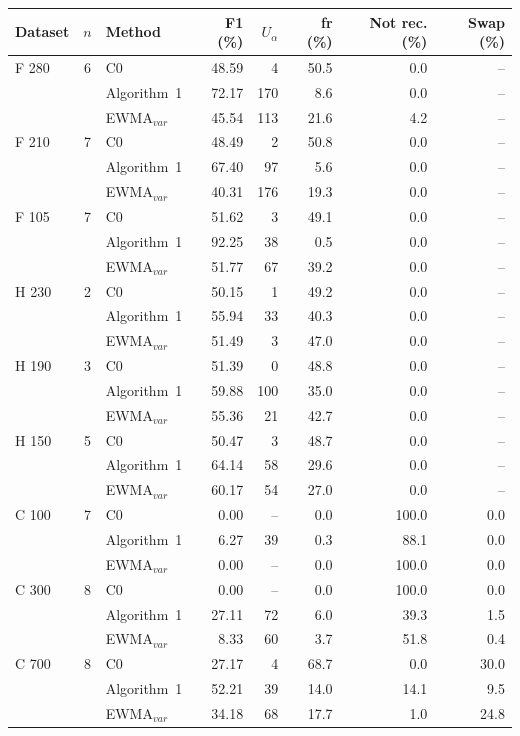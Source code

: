\begin{tabular}{lclrrrrr}
\hline
Dataset & $n$ & Method & F1 (\%) & $U_\alpha$ & fr (\%) & Not rec. (\%) & Swap (\%) \\ \hline
F  280 & 6 & C0 & 48.59 & 4 & 50.5 & 0.0 & -- \\
 &  & Algorithm~1 & 72.17 & 170 & 8.6 & 0.0 & -- \\
 &  & EWMA$_{var}$ & 45.54 & 113 & 21.6 & 4.2 & -- \\
\hline
F  210 & 7 & C0 & 48.49 & 2 & 50.8 & 0.0 & -- \\
 &  & Algorithm~1 & 67.40 & 97 & 5.6 & 0.0 & -- \\
 &  & EWMA$_{var}$ & 40.31 & 176 & 19.3 & 0.0 & -- \\
\hline
F  105 & 7 & C0 & 51.62 & 3 & 49.1 & 0.0 & -- \\
 &  & Algorithm~1 & 92.25 & 38 & 0.5 & 0.0 & -- \\
 &  & EWMA$_{var}$ & 51.77 & 67 & 39.2 & 0.0 & -- \\
\hline
H  230 & 2 & C0 & 50.15 & 1 & 49.2 & 0.0 & -- \\
 &  & Algorithm~1 & 55.94 & 33 & 40.3 & 0.0 & -- \\
 &  & EWMA$_{var}$ & 51.49 & 3 & 47.0 & 0.0 & -- \\
\hline
H  190 & 3 & C0 & 51.39 & 0 & 48.8 & 0.0 & -- \\
 &  & Algorithm~1 & 59.88 & 100 & 35.0 & 0.0 & -- \\
 &  & EWMA$_{var}$ & 55.36 & 21 & 42.7 & 0.0 & -- \\
\hline
H  150 & 5 & C0 & 50.47 & 3 & 48.7 & 0.0 & -- \\
 &  & Algorithm~1 & 64.14 & 58 & 29.6 & 0.0 & -- \\
 &  & EWMA$_{var}$ & 60.17 & 54 & 27.0 & 0.0 & -- \\
\hline
C  100 & 7 & C0 & 0.00 & -- & 0.0 & 100.0 & 0.0 \\
 &  & Algorithm~1 & 6.27 & 39 & 0.3 & 88.1 & 0.0 \\
 &  & EWMA$_{var}$ & 0.00 & -- & 0.0 & 100.0 & 0.0 \\
\hline
C  300 & 8 & C0 & 0.00 & -- & 0.0 & 100.0 & 0.0 \\
 &  & Algorithm~1 & 27.11 & 72 & 6.0 & 39.3 & 1.5 \\
 &  & EWMA$_{var}$ & 8.33 & 60 & 3.7 & 51.8 & 0.4 \\
\hline
C  700 & 8 & C0 & 27.17 & 4 & 68.7 & 0.0 & 30.0 \\
 &  & Algorithm~1 & 52.21 & 39 & 14.0 & 14.1 & 9.5 \\
 &  & EWMA$_{var}$ & 34.18 & 68 & 17.7 & 1.0 & 24.8 \\
\hline
\end{tabular}
